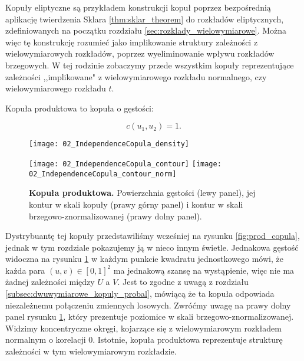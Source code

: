 Kopuły eliptyczne są przykładem konstrukcji kopuł poprzez bezpośrednią aplikację twierdzenia Sklara \ref{thm:sklar_theorem} do rozkładów eliptycznych, zdefiniowanych na początku rozdziału \ref{sec:rozklady_wielowymiarowe}. Można więc tę konstrukcję rozumieć jako implikowanie struktury zależności z wielowymiarowych rozkładów, poprzez wyeliminowanie wpływu rozkładów brzegowych. W tej rodzinie zobaczymy przede wszystkim kopuły reprezentujące zależności ,,implikowane" z wielowymiarowego rozkładu normalnego, czy wielowymiarowego rozkładu $t$.

\begin{df}
	Kopuła produktowa to kopuła o gęstości:
	
	$$ c(u_1, u_2) = 1.$$
	
\end{df}
\begin{figure}[h]
	\centering
	\begin{minipage}{0.5\linewidth}
		\texttt{[image: 02\_IndependenceCopula\_density]}
	\end{minipage}
	\begin{minipage}{0.45\linewidth}
		\texttt{[image: 02\_IndependenceCopula\_contour]}
		\texttt{[image: 02\_IndependenceCopula\_contour\_norm]}
	\end{minipage}
	\caption{\textbf{Kopuła produktowa.} Powierzchnia gęstości (lewy panel), jej kontur w skali kopuły (prawy górny panel) i kontur w skali brzegowo-znormalizowanej (prawy dolny panel). \label{fig:product_copula_density}}
\end{figure}

Dystrybuantę tej kopuły przedstawiliśmy wcześniej na rysunku \ref{fig:prod_copula}, jednak w tym rozdziale pokazujemy ją w nieco innym świetle. Jednakowa gęstość widoczna na rysunku \ref{fig:product_copula_density} w każdym punkcie kwadratu jednostkowego mówi, że każda para $(u, v) \in [0,1]^2$ ma jednakową szansę na wystąpienie, więc nie ma żadnej zależności między $U$ a $V$. Jest to zgodne z uwagą z rozdziału \ref{subsec:dwuwymiarowe_kopuly_probal}, mówiącą że ta kopuła odpowiada niezależnemu połączeniu zmiennych losowych. Zwróćmy uwagę na prawy dolny panel rysunku \ref{fig:product_copula_density}, który prezentuje poziomice w skali brzegowo-znormalizowanej. Widzimy koncentryczne okręgi, kojarzące się z wielowymiarowym rozkładem normalnym o korelacji $0$. Istotnie, kopuła produktowa reprezentuje strukturę zależności w tym wielowymiarowym rozkładzie.

